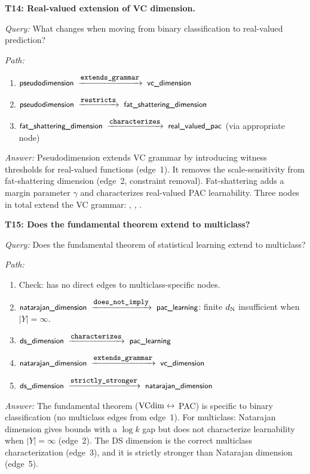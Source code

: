 \begin{traversal}
\textbf{T14: Real-valued extension of VC dimension.}\par\medskip
\emph{Query:} What changes when moving from binary classification to real-valued prediction?\par
\emph{Path:}\par
\begin{enumerate}[leftmargin=2em, nosep]
  \item $\edge{pseudodimension}{extends\_grammar}{vc\_dimension}$
  \item $\edge{pseudodimension}{restricts}{fat\_shattering\_dimension}$
  \item $\edge{fat\_shattering\_dimension}{characterizes}{real\_valued\_pac}$ (via appropriate node)
\end{enumerate}
\emph{Answer:} Pseudodimension extends VC grammar by introducing witness thresholds for real-valued functions (edge~1). It removes the scale-sensitivity from fat-shattering dimension (edge~2, constraint removal). Fat-shattering adds a margin parameter $\gamma$ and characterizes real-valued PAC learnability.  Three nodes in total extend the VC grammar: , , .
\end{traversal}

\begin{traversal}
\textbf{T15: Does the fundamental theorem extend to multiclass?}\par\medskip
\emph{Query:} Does the fundamental theorem of statistical learning extend to multiclass?\par
\emph{Path:}\par
\begin{enumerate}[leftmargin=2em, nosep]
  \item Check:  has no direct edges to multiclass-specific nodes.
  \item $\edge{natarajan\_dimension}{does\_not\_imply}{pac\_learning}$: finite $d_{\mathrm{N}}$ insufficient when $|Y| = \infty$.
  \item $\edge{ds\_dimension}{characterizes}{pac\_learning}$ \cite{BrukhimCarmonDinurMoranYehudayoff2022}
  \item $\edge{natarajan\_dimension}{extends\_grammar}{vc\_dimension}$
  \item $\edge{ds\_dimension}{strictly\_stronger}{natarajan\_dimension}$ \cite{BrukhimCarmonDinurMoranYehudayoff2022}
\end{enumerate}
\emph{Answer:} The fundamental theorem ($\mathrm{VCdim} \leftrightarrow$ PAC) is specific to binary classification (no multiclass edges from edge~1).  For multiclass: Natarajan dimension gives bounds with a $\log k$ gap but does not characterize learnability when $|Y| = \infty$ (edge~2).  The DS dimension is the correct multiclass characterization (edge~3), and it is strictly stronger than Natarajan dimension (edge~5).
\end{traversal}
